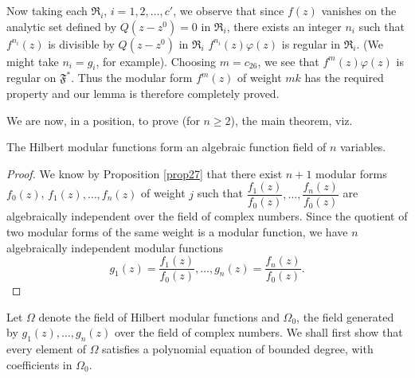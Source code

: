 Now taking each $\mathfrak{R}_{i}$, $i=1,2,\ldots,c'$, we observe that
since $f(z)$ vanishes on the analytic set defined by $Q(z-z^{0})=0$ in
$\mathfrak{R}_{i}$, there exists an integer $n_{i}$ such that
$f^{n_{i}}(z)$ is divisible by $Q(z-z^{0})$ in $\mathfrak{R}_{i}$ \ie
$f^{n_{i}}(z)\varphi(z)$ is regular in $\mathfrak{R}_{i}$. (We might
take $n_{i}=g_{i}$, for example). Choosing $m=c_{26}$, we see that
$f^{m}(z)\varphi(z)$ is regular on $\mathfrak{F}^{\ast}$. Thus the
modular form $f^{m}(z)$ of weight $mk$ has the required property and
our lemma is therefore completely proved.

We are now, in a position, to prove (for $n\geq 2$), the main theorem,
viz.

\begin{thm}\label{thm19}
The Hilbert modular functions form an algebraic function field of $n$
variables. 
\end{thm}

\begin{proof}
We know by Proposition \ref{prop27} that there exist $n+1$ modular
forms\pageoriginale $f_{0}(z)$, $f_{1}(z),\ldots,f_{n}(z)$ of weight
$j$ such that
$\dfrac{f_{1}(z)}{f_{0}(z)},\ldots,\dfrac{f_{n}(z)}{f_{0}(z)}$ are
algebraically independent over the field of complex numbers. Since the
quotient of two modular forms of the same weight is a modular
function, we have $n$ algebraically independent modular functions
$$
g_{1}(z)=\dfrac{f_{1}(z)}{f_{0}(z)},\ldots,g_{n}(z)=\dfrac{f_{n}(z)}{f_{0}(z)}.
$$
\end{proof}

Let $\Omega$ denote the field of Hilbert modular functions and
$\Omega_{0}$, the field generated by $g_{1}(z),\ldots,g_{n}(z)$ over
the field of complex numbers. We shall first show that every element
of $\Omega$ satisfies a polynomial equation of bounded degree, with
coefficients in $\Omega_{0}$.

